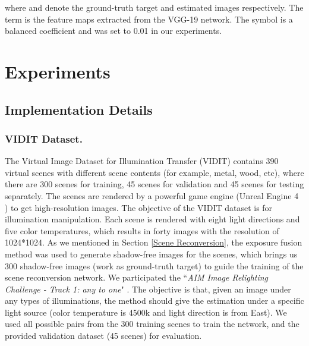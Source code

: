 \documentclass[runningheads]{llncs}
\begin{document}
where  and  denote the ground-truth target and estimated images respectively. The term  is the feature maps extracted from the VGG-19 network. The symbol  is a balanced coefficient and was set to 0.01 in our experiments.


\baselineskip 
\section{Experiments}
\baselineskip 
\subsection{Implementation Details}
\baselineskip 

\subsubsection{VIDIT Dataset.}

The Virtual Image Dataset for Illumination Transfer (VIDIT) \cite{helou2020vidit} contains 390 virtual scenes with different scene contents (for example, metal, wood, etc), where there are 300 scenes for training, 45 scenes for validation and 45 scenes for testing separately. The scenes are rendered by a powerful game engine (Unreal Engine 4 \cite{UE4}) to get high-resolution images. The objective of the VIDIT dataset is for illumination manipulation. Each scene is rendered with eight light directions and five color temperatures, which results in forty images with the resolution of 1024*1024. As we mentioned in Section \ref{Scene Reconversion}, the exposure fusion method was used to generate shadow-free images for the scenes, which brings us 300 shadow-free images (work as ground-truth target) to guide the training of the scene reconversion network. We participated the ``\emph{AIM Image Relighting Challenge  - Track 1: any to one}" \cite{elhelou2020aim}. The objective is that, given an image under any types of illuminations, the method should give the estimation under a specific light source (color temperature is 4500k and light direction is from East). We used all possible pairs from the 300 training scenes to train the network, and the provided validation dataset (45 scenes) for evaluation.

\vskip -0.5cm
\baselineskip 
\end{document}
